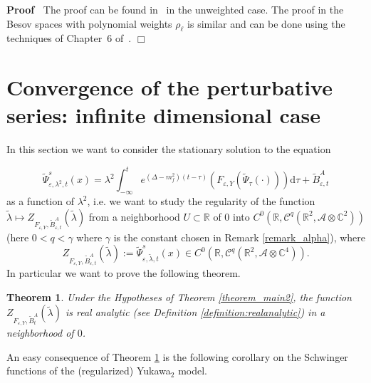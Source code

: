 \documentclass{article}
\newcommand{\assign}{:=}
\newcommand{\mathd}{\mathrm{d}}
\newenvironment{proof}{\noindent\textbf{Proof\ }}{\hspace*{\fill}$\Box$\medskip}
\newtheorem{theorem}{Theorem}
\begin{document}
\begin{proof}
  The proof can be found in~{\cite{Amann2019}} in the unweighted case. The
  proof in the Besov spaces with polynomial weights $\rho_{\ell}$ is similar
  and can be done using the techniques of Chapter~6 of~{\cite{TriebelIII}}. 
\end{proof}

\section{Convergence of the perturbative series: infinite dimensional
case}\label{appendix:convergenceinfinitedim}

In this section we want to consider the stationary solution to the equation


\begin{equation}
  \tilde{\Psi}^s_{\varepsilon, \lambda^2, t} (x) = \lambda^2 \int_{- \infty}^t
  e^{(\Delta - m_f^2) (t - \tau)} (F_{\varepsilon, Y} (\tilde{\Psi}_{\tau}
  (\cdot))) \mathd \tau + \tilde{B}^A_{\varepsilon, t} \label{eq:real1}
\end{equation}
as a function of $\lambda^2$, i.e. we want to study the regularity of the
function $\tilde{\lambda} \longmapsto Z_{F_{\varepsilon, Y},
\tilde{B}^A_{\varepsilon, t}} (\tilde{\lambda})$ from a neighborhood $U
\subset \mathbb{R}$ of 0 into $C^0 (\mathbb{R}, \mathcal{C}^q (\mathbb{R}^2,
\mathcal{A} \otimes \mathbb{C}^2))$ (here $0 < q < \gamma$ where $\gamma$ is
the constant chosen in Remark \ref{remark_alpha}), where
\[ Z_{F_{\varepsilon, Y}, \tilde{B}^A_{\varepsilon, t}} (\tilde{\lambda})
   \assign \tilde{\Psi}^s_{\varepsilon, \tilde{\lambda}, t} (x) \in C^0
   (\mathbb{R}, \mathcal{C}^q (\mathbb{R}^2, \mathcal{A} \otimes
   \mathbb{C}^4)) . \]
In particular we want to prove the following theorem.

\begin{theorem}
  \label{theorem:realanalyticity}Under the Hypotheses of Theorem
  \ref{theorem_main2}, the function $Z_{F_{\varepsilon, Y}, \tilde{B}^A_t}
  (\tilde{\lambda})$ is real analytic (see Definition
  \ref{definition:realanalytic}) in a neighborhood of $0$.
\end{theorem}

An easy consequence of Theorem \ref{theorem:realanalyticity} is the following
corollary on the Schwinger functions of the (regularized) Yukawa$_2$ model.
\end{document}
